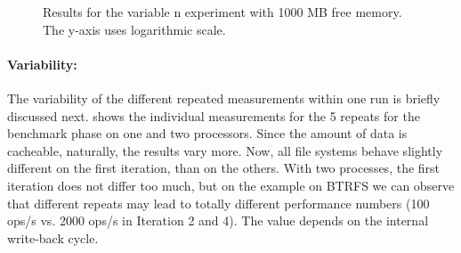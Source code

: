 \documentclass[a4paper,10pt]{article}
\begin{document}
\begin{figure}
\centering
{}
\caption{Results for the variable n experiment with 1000 MB free memory. The y-axis uses logarithmic scale. \label{fig:variable-count-1000}}
\end{figure}



\paragraph{Variability:}
The variability of the different repeated measurements within one run is briefly discussed next.
 shows the individual measurements for the 5 repeats for the benchmark phase on one and two processors.
Since the amount of data is cacheable, naturally, the results vary more.
Now, all file systems behave slightly different on the first iteration, than on the others.
With two processes, the first iteration does not differ too much, but on the example on BTRFS we can observe that different repeats may lead to totally different performance numbers (100 ops/s vs. 2000 ops/s in Iteration 2 and 4).
The value depends on the internal write-back cycle.
\end{document}
